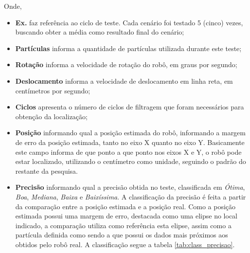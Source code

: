 Onde,
\begin{itemize}
  \item \textbf{Ex.} faz referência ao ciclo de teste. Cada cenário foi testado 5 (cinco) vezes, buscando obter a média como resultado
  final do cenário;

  \item \textbf{Partículas} informa a quantidade de partículas utilizada durante este teste;

  \item \textbf{Rotação} informa a velocidade de rotação do robô, em graus por segundo;

  \item \textbf{Deslocamento} informa a velocidade de deslocamento em linha reta, em centímetros por segundo;

  \item \textbf{Ciclos} apresenta o número de ciclos de filtragem que foram necessários para obtenção da localização;

  \item \textbf{Posição} informando qual a posição estimada do robô, informando a margem de erro da posição estimada, tanto no eixo X
  quanto no eixo Y. Basicamente este campo informa de que ponto a que ponto nos eixos X e Y, o robô pode estar localizado, utilizando o
  centímetro como unidade, seguindo o padrão do restante da pesquisa.

  \item \textbf{Precisão} informando qual a precisão obtida no teste, classificada em \textit{Ótima}, \textit{Boa}, \textit{Mediana},
  \textit{Baixa} e \textit{Baixíssima}. A classificação da precisão é feita a partir da comparação entre a posição estimada e a posição real.
  Como a posição estimada possui uma margem de erro, destacada como uma elipse no local indicado, a comparação utiliza como referência
  esta elipse, assim como a partícula definida como sendo a que possui os dados mais próximos aos obtidos pelo robô real. A classificação
  segue a tabela \ref{tab:class_precisao}.


\end{itemize}
